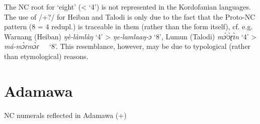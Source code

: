 The NC root for ‘eight’ (< ‘4’) is not represented in the Kordofanian languages. The use of /+?/ for Heiban and Talodi is only due to the fact that the Proto-NC pattern (8 = 4 redupl.) is traceable in them (rather than the form itself), cf. e.g. Warnang (Heiban) \textit{ŋè-làmlàŋ} ‘4’ > \textit{ŋe-lamlaaŋ-ɔ} ‘8’, Lumun (Talodi) \textit{m{\'{ɔ}}ʲ{\`{ɔ}}ɽ{\`{ɪ}}n} ‘4’ > \textit{má-m{\`{ɔ}}ɾm{\`{ɔ}}ɾ}~~~‘8’. This resemblance, however, may be due to typological (rather than etymological) reasons. 

\clearpage
\section{Adamawa}%

\begin{table}
\caption{\label{tab:5:6}NC numerals reflected in Adamawa (+)}
\small


\end{table}
